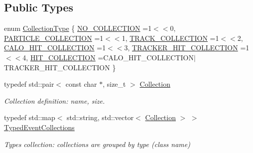 \subsection*{Public Types}
\begin{DoxyCompactItemize}
\item 
enum \hyperlink{class_d_d4hep_1_1_event_handler_a0b22a141a019364495835317fad48254}{Collection\+Type} \{ \newline
\hyperlink{class_d_d4hep_1_1_event_handler_a0b22a141a019364495835317fad48254a97cb7e022ec3a608b95e9c0f0395f875}{N\+O\+\_\+\+C\+O\+L\+L\+E\+C\+T\+I\+ON} =1$<$$<$0, 
\hyperlink{class_d_d4hep_1_1_event_handler_a0b22a141a019364495835317fad48254a694c9a04628f4dd1ac5bae0697b6403b}{P\+A\+R\+T\+I\+C\+L\+E\+\_\+\+C\+O\+L\+L\+E\+C\+T\+I\+ON} =1$<$$<$1, 
\hyperlink{class_d_d4hep_1_1_event_handler_a0b22a141a019364495835317fad48254a320d668d3b9972c63a98e2cbf788a6a4}{T\+R\+A\+C\+K\+\_\+\+C\+O\+L\+L\+E\+C\+T\+I\+ON} =1$<$$<$2, 
\hyperlink{class_d_d4hep_1_1_event_handler_a0b22a141a019364495835317fad48254af204316bf52273227210419965b95b43}{C\+A\+L\+O\+\_\+\+H\+I\+T\+\_\+\+C\+O\+L\+L\+E\+C\+T\+I\+ON} =1$<$$<$3, 
\newline
\hyperlink{class_d_d4hep_1_1_event_handler_a0b22a141a019364495835317fad48254a157b5d4bcda403c48a5cb368d8671761}{T\+R\+A\+C\+K\+E\+R\+\_\+\+H\+I\+T\+\_\+\+C\+O\+L\+L\+E\+C\+T\+I\+ON} =1$<$$<$4, 
\hyperlink{class_d_d4hep_1_1_event_handler_a0b22a141a019364495835317fad48254acaedbfda8dbee1f6ab8d296b875dcb07}{H\+I\+T\+\_\+\+C\+O\+L\+L\+E\+C\+T\+I\+ON} =C\+A\+L\+O\+\_\+\+H\+I\+T\+\_\+\+C\+O\+L\+L\+E\+C\+T\+I\+O\+N$\vert$\+T\+R\+A\+C\+K\+E\+R\+\_\+\+H\+I\+T\+\_\+\+C\+O\+L\+L\+E\+C\+T\+I\+ON
 \}
\item 
typedef std\+::pair$<$ const char $\ast$, size\+\_\+t $>$ \hyperlink{class_d_d4hep_1_1_event_handler_abc271087910b2013962fa4a83d4f349e}{Collection}
\begin{DoxyCompactList}\small\item\em Collection definition\+: name, size. \end{DoxyCompactList}\item 
typedef std\+::map$<$ std\+::string, std\+::vector$<$ \hyperlink{class_d_d4hep_1_1_event_handler_abc271087910b2013962fa4a83d4f349e}{Collection} $>$ $>$ \hyperlink{class_d_d4hep_1_1_event_handler_a4d441ff8a824b1e2f278e8b7a6391af3}{Typed\+Event\+Collections}
\begin{DoxyCompactList}\small\item\em Types collection\+: collections are grouped by type (class name) \end{DoxyCompactList}\end{DoxyCompactItemize}
